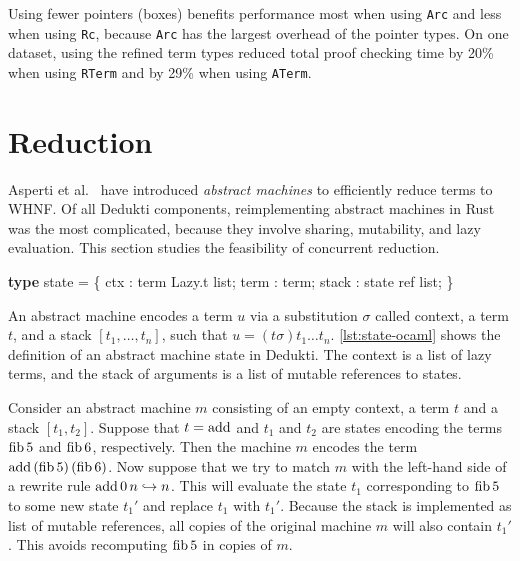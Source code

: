 \documentclass[screen,sigplan,10pt]{acmart}
\newenvironment{Shaded}{}{}
\newcommand{\DataTypeTok}[1]{\textcolor[rgb]{0.56,0.13,0.00}{#1}}
\newcommand{\KeywordTok}[1]{\textcolor[rgb]{0.00,0.44,0.13}{\textbf{#1}}}
\newcommand{\NormalTok}[1]{#1}
\begin{document}
Using fewer pointers (boxes) benefits performance most when using
\texttt{Arc} and less when using \texttt{Rc}, because \texttt{Arc} has
the largest overhead of the pointer types. On one dataset, using the
refined term types reduced total proof checking time by 20\% when using
\texttt{RTerm} and by 29\% when using \texttt{ATerm}.

\hypertarget{reduction}{%
\section{Reduction}\label{reduction}}

Asperti et al.~\citep{asperti2009} have introduced \emph{abstract
machines} to efficiently reduce terms to WHNF. Of all Dedukti
components, reimplementing abstract machines in Rust was the most
complicated, because they involve sharing, mutability, and lazy
evaluation. This section studies the feasibility of concurrent
reduction.

\begin{listing}\begin{Shaded}
\begin{Highlighting}[]
\KeywordTok{type}\NormalTok{ state = \{}
\NormalTok{  ctx : term }\DataTypeTok{Lazy}\NormalTok{.t }\DataTypeTok{list}\NormalTok{;}
\NormalTok{  term : term;}
\NormalTok{  stack : state }\DataTypeTok{ref} \DataTypeTok{list}\NormalTok{;}
\NormalTok{\}}
\end{Highlighting}
\end{Shaded}


\caption{Abstract machine state in OCaml.}

\hypertarget{lst:state-ocaml}{%
\label{lst:state-ocaml}}%
\end{listing}

An abstract machine encodes a term \(u\) via a substitution \(\sigma\)
called context, a term \(t\), and a stack \([t_1, \dots, t_n]\), such
that \(u = (t \sigma) t_1 \dots t_n\). \autoref{lst:state-ocaml} shows
the definition of an abstract machine state in Dedukti. The context is a
list of lazy terms, and the stack of arguments is a list of mutable
references to states.

\begin{example}Consider an abstract machine \(m\) consisting of an empty
context, a term \(t\) and a stack \([t_1, t_2]\). Suppose that
\(t = \operatorname{add}\) and \(t_1\) and \(t_2\) are states encoding the terms
\(\operatorname{fib} 5\) and \(\operatorname{fib} 6\), respectively. Then the machine \(m\) encodes
the term \(\operatorname{add}\, (\operatorname{fib} 5)\, (\operatorname{fib} 6)\). Now suppose that we try to
match \(m\) with the left-hand side of a rewrite rule
\(\operatorname{add} 0\, n \hookrightarrow n\). This will evaluate the state \(t_1\)
corresponding to \(\operatorname{fib} 5\) to some new state \(t_1'\) and replace
\(t_1\) with \(t_1'\). Because the stack is implemented as list of
mutable references, all copies of the original machine \(m\) will also
contain \(t_1'\). This avoids recomputing \(\operatorname{fib} 5\) in copies of
\(m\).\end{example}
\end{document}
